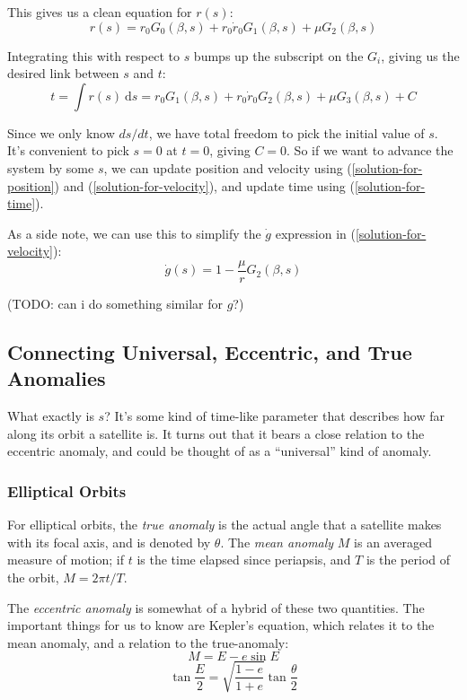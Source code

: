 \documentclass{article}
\newcommand{\dd}{\mathrm{d}}
\numberwithin{equation}{subsection}
\begin{document}
This gives us a clean equation for $r(s)$:
\begin{equation}
r(s) = r_0 G_0(\beta, s) + r_0 \dot{r}_0 G_1(\beta, s) + \mu G_2(\beta, s)
\end{equation}

Integrating this with respect to $s$ bumps up the subscript on the $G_i$, giving us the desired link between $s$ and $t$:
\begin{equation}
\label{solution-for-time}
t = \int r(s)~\dd s = r_0 G_1(\beta, s) + r_0 \dot{r}_0 G_2(\beta, s) + \mu G_3(\beta, s) + C
\end{equation}

Since we only know $ds/dt$, we have total freedom to pick the initial value of $s$. It's convenient to pick $s = 0$ at $t = 0$, giving $C = 0$. So if we want to advance the system by some $s$, we can update position and velocity using (\ref{solution-for-position}) and (\ref{solution-for-velocity}), and update time using (\ref{solution-for-time}).

As a side note, we can use this to simplify the $\dot g$ expression in (\ref{solution-for-velocity}):
\begin{equation}
\dot g(s) = 1 - \frac{\mu}{r} G_2(\beta, s)
\end{equation}

(TODO: can i do something similar for $g$?)

\subsection{Connecting Universal, Eccentric, and True Anomalies}

What exactly is $s$? It's some kind of time-like parameter that describes how far along its orbit a satellite is. It turns out that it bears a close relation to the eccentric anomaly, and could be thought of as a ``universal'' kind of anomaly.

\subsubsection*{Elliptical Orbits}

For elliptical orbits, the \emph{true anomaly} is the actual angle that a satellite makes with its focal axis, and is denoted by $\theta$. The \emph{mean anomaly} $M$ is an averaged measure of motion; if $t$ is the time elapsed since periapsis, and $T$ is the period of the orbit, $M = 2 \pi t / T$.

The \emph{eccentric anomaly} is somewhat of a hybrid of these two quantities. The important things for us to know are Kepler's equation, which relates it to the mean anomaly, and a relation to the true-anomaly:
\begin{equation}
\label{keplers-equation}
M = E - e \sin E
\end{equation}
\begin{equation}
\label{eccentric-anomaly}
\tan{\frac{E}{2}} = \sqrt{\frac{1-e}{1+e}} \tan{\frac{\theta}{2}}
\end{equation}
\end{document}
